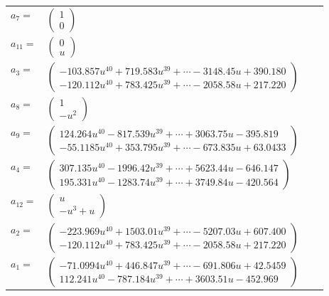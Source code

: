\documentclass[1p]{elsarticle_modified}
\theoremstyle{definition}
\begin{document}
\begin{tabular}{m{7pt} m{180pt} m{7pt} m{180pt} }
\flushright $a_{7}=$&$\begin{pmatrix}1\\0\end{pmatrix}$ \\
\flushright $a_{11}=$&$\begin{pmatrix}0\\u\end{pmatrix}$ \\
\flushright $a_{3}=$&$\begin{pmatrix}-103.857 u^{40}+719.583 u^{39}+\cdots-3148.45 u+390.180\\-120.112 u^{40}+783.425 u^{39}+\cdots-2058.58 u+217.220\end{pmatrix}$ \\
\flushright $a_{8}=$&$\begin{pmatrix}1\\- u^2\end{pmatrix}$ \\
\flushright $a_{9}=$&$\begin{pmatrix}124.264 u^{40}-817.539 u^{39}+\cdots+3063.75 u-395.819\\-55.1185 u^{40}+353.795 u^{39}+\cdots-673.835 u+63.0433\end{pmatrix}$ \\
\flushright $a_{4}=$&$\begin{pmatrix}307.135 u^{40}-1996.42 u^{39}+\cdots+5623.44 u-646.147\\195.331 u^{40}-1283.74 u^{39}+\cdots+3749.84 u-420.564\end{pmatrix}$ \\
\flushright $a_{12}=$&$\begin{pmatrix}u\\- u^3+u\end{pmatrix}$ \\
\flushright $a_{2}=$&$\begin{pmatrix}-223.969 u^{40}+1503.01 u^{39}+\cdots-5207.03 u+607.400\\-120.112 u^{40}+783.425 u^{39}+\cdots-2058.58 u+217.220\end{pmatrix}$ \\
\flushright $a_{1}=$&$\begin{pmatrix}-71.0994 u^{40}+446.847 u^{39}+\cdots-691.806 u+42.5459\\112.241 u^{40}-787.184 u^{39}+\cdots+3603.51 u-452.969\end{pmatrix}$ \\

\end{tabular}
\end{document}
